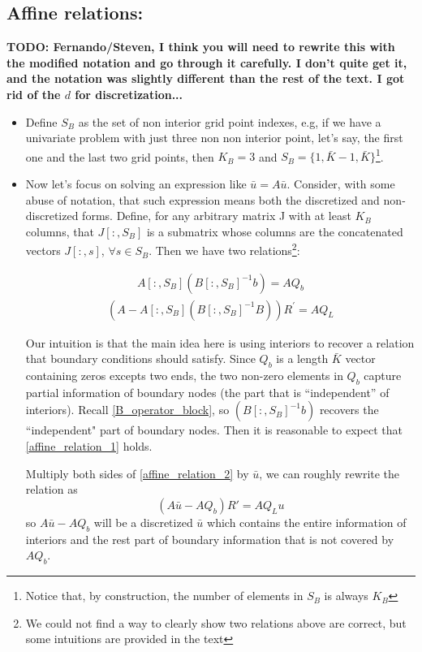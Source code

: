\documentclass[11pt]{article}
\begin{document}
		\subsection{Affine relations:}
		\textbf{TODO: Fernando/Steven, I think you will need to rewrite this with the modified notation and go through it carefully.  I don't quite get it, and the notation was slightly different than the rest of the text.  I got rid of the $d$ for discretization...}
		\begin{itemize}
		\item Define $S_B$ as the set of non interior grid point indexes, e.g, if we have a univariate problem with just three non non interior point, let's say, the first one and the last two grid points, then $K_B = 3$ and $S_B = \{1,\bar{K}-1,\bar{K}\}$\footnote{Notice that, by construction, the number of elements in $S_B$ is always $K_B$}.
			\item Now let's focus on solving an expression like $\bar{u} = A \bar{u}$. Consider, with some abuse of notation, that such expression means both the discretized and non-discretized forms. Define, for any arbitrary matrix J with at least $K_B$ columns, that $J[:,S_B]$ is a submatrix whose columns are the concatenated vectors $J[:,s]$, $\forall s \in S_B$.
			Then we have two relations\footnote{We could not find a way to clearly show two relations above are correct, but some intuitions are provided in the text}:

			\begin{align}
			A [:,S_B] \left(B[:,S_B]^{-1} b \right) = A  Q_b\label{affine_relation_1}
			\end{align}
			\begin{align}
			(A -A [:,S_B] (B[:,S_B]^{-1} B)) R^{'} = A  Q_L\label{affine_relation_2}
			\end{align}

			Our intuition is that the main idea here is using interiors to recover a relation that boundary conditions should satisfy. Since $Q_b$ is a length $\bar{K}$ vector containing zeros excepts two ends, the two non-zero elements in $Q_b$ capture partial information of boundary nodes (the part that is ``independent'' of interiors).  Recall \eqref{B_operator_block}, so $\left(B[:,S_B]^{-1} b \right)$ recovers the ``independent" part of boundary nodes. Then it is reasonable to expect that \eqref{affine_relation_1} holds.

			Multiply both sides of \eqref{affine_relation_2} by $\bar{u}$, we can roughly rewrite the relation as
			\begin{equation}
			(A \bar{u}-A  Q_b)  R' = A  Q_L u
			\end{equation}
			so $A \bar{u}-A   Q_b$ will be a discretized $\bar{u}$ which contains the entire information of interiors and the rest part of boundary information that is not covered by $A  Q_b$.


\end{itemize}
\end{document}
